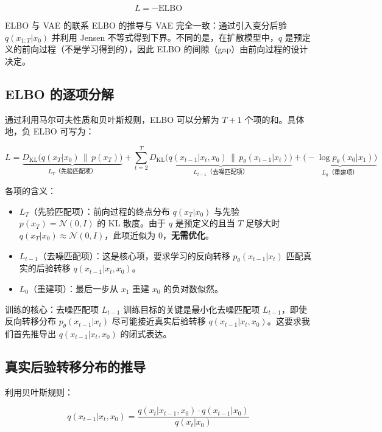 \documentclass[a4paper]{article}
\begin{document}
$$L = -\text{ELBO}$$

\begin{knowledgebox}{ELBO 与 VAE 的联系}
ELBO 的推导与 VAE 完全一致：通过引入变分后验 $q(x_{1:T}|x_0)$ 并利用 Jensen 不等式得到下界。不同的是，在扩散模型中，$q$ 是预定义的前向过程（不是学习得到的），因此 ELBO 的间隙（gap）由前向过程的设计决定。
\end{knowledgebox}

\subsection{ELBO 的逐项分解}

通过利用马尔可夫性质和贝叶斯规则，ELBO 可以分解为 $T+1$ 个项的和。具体地，负 ELBO 可写为：

$$L = \underbrace{D_{\text{KL}}\big(q(x_T|x_0) \,\|\, p(x_T)\big)}_{L_T\text{（先验匹配项）}} + \sum_{t=2}^{T} \underbrace{D_{\text{KL}}\big(q(x_{t-1}|x_t, x_0) \,\|\, p_\theta(x_{t-1}|x_t)\big)}_{L_{t-1}\text{（去噪匹配项）}} + \underbrace{\big(-\log p_\theta(x_0|x_1)\big)}_{L_0\text{（重建项）}}$$

各项的含义：
\begin{itemize}
    \item $L_T$（先验匹配项）：前向过程的终点分布 $q(x_T|x_0)$ 与先验 $p(x_T) = \mathcal{N}(0,I)$ 的 KL 散度。由于 $q$ 是预定义的且当 $T$ 足够大时 $q(x_T|x_0) \approx \mathcal{N}(0,I)$，此项近似为 0，\textbf{无需优化}。
    \item $L_{t-1}$（去噪匹配项）：这是核心项，要求学习的反向转移 $p_\theta(x_{t-1}|x_t)$ 匹配真实的后验转移 $q(x_{t-1}|x_t, x_0)$。
    \item $L_0$（重建项）：最后一步从 $x_1$ 重建 $x_0$ 的负对数似然。
\end{itemize}

\begin{importantbox}{训练的核心：去噪匹配项 $L_{t-1}$}
训练目标的关键是最小化去噪匹配项 $L_{t-1}$，即使反向转移分布 $p_\theta(x_{t-1}|x_t)$ 尽可能接近真实后验转移 $q(x_{t-1}|x_t, x_0)$。这要求我们首先推导出 $q(x_{t-1}|x_t, x_0)$ 的闭式表达。
\end{importantbox}

\subsection{真实后验转移分布的推导}

利用贝叶斯规则：

$$q(x_{t-1}|x_t, x_0) = \frac{q(x_t|x_{t-1}, x_0) \cdot q(x_{t-1}|x_0)}{q(x_t|x_0)}$$
\end{document}
